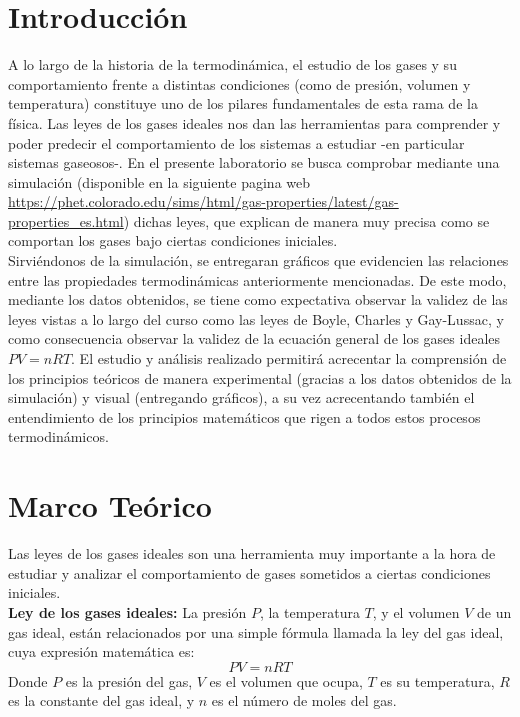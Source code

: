 \documentclass[12pt]{article}
\begin{document}
\section*{Introducción}
A lo largo de la historia de la termodinámica, el estudio de los gases y 
su comportamiento frente a distintas condiciones (como de presión, 
volumen y temperatura) constituye uno de los pilares fundamentales de 
esta rama de la física. Las leyes de los gases ideales nos dan las 
herramientas para comprender y poder predecir el comportamiento de los 
sistemas a estudiar -en particular sistemas gaseosos-.  En el presente 
laboratorio se busca comprobar mediante una simulación (disponible en la 
siguiente pagina web \url{https://phet.colorado.edu/sims/html/gas-properties/latest/gas-properties_es.html}) 
dichas leyes, que explican de manera muy precisa como se comportan los 
gases bajo ciertas condiciones iniciales. \\

Sirviéndonos de la simulación, se entregaran gráficos que evidencien las 
relaciones entre las propiedades termodinámicas anteriormente mencionadas.
De este modo, mediante los datos obtenidos, se tiene como expectativa 
observar la validez de las leyes vistas a lo largo del curso como las 
leyes de Boyle, Charles y Gay-Lussac, y como consecuencia observar la 
validez de la ecuación general de los gases ideales $PV=nRT$. El estudio 
y análisis realizado permitirá  acrecentar la comprensión de los 
principios teóricos de manera experimental (gracias a los datos obtenidos 
de la simulación) y visual (entregando gráficos), a su vez acrecentando 
también el entendimiento de los principios matemáticos que rigen a todos 
estos procesos termodinámicos.

\section*{Marco Teórico}
Las leyes de los gases ideales son una herramienta muy importante a la 
hora de estudiar y analizar el comportamiento de gases sometidos a ciertas 
condiciones iniciales. \\

\textbf{Ley de los gases ideales:} La presión $P$, la temperatura $T$, y el volumen 
$V$ de un gas ideal, están relacionados por una simple fórmula llamada 
la ley del gas ideal, cuya expresión matemática es:
\[
PV=nRT
\]
Donde $P$ es la presión del gas, $V$ es el volumen que ocupa, $T$ es su 
temperatura, $R$ es la constante del gas ideal, y $n$ es el número de moles
del gas. \parencite{khanleygasesideales} \\
\end{document}

